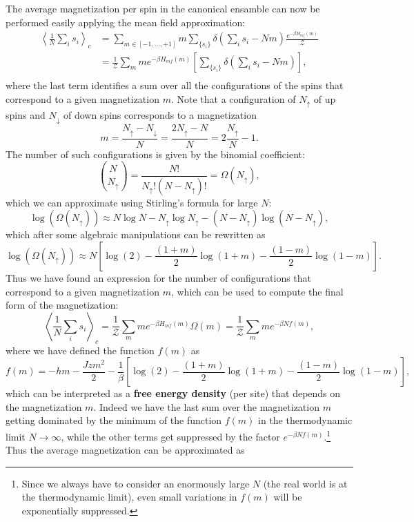 The average magnetization per spin in the canonical ensamble can now be performed easily applying the mean field approximation:
\[
    \begin{aligned}
        \left\langle \frac{1}{N} \sum_{i} s_i \right\rangle_c & = \sum_{m \in [-1, \ldots, +1]} m \sum_{\{s_i\}} \delta\left(\sum_{i} s_i - Nm\right) \frac{e^{-\beta H_{mf}(m)}}{\mathcal{Z}} \\
                                                              & = \frac{1}{\mathcal{Z}} \sum_{m} m e^{-\beta H_{mf}(m)} \left[ \sum_{\{s_i\}} \delta\left(\sum_{i} s_i - Nm\right) \right],    \\
    \end{aligned}
\]
where the last term identifies a sum over all the configurations of the spins that correspond to a given magnetization \(m\). Note that a configuration of \(N_{\uparrow}\) of up spins and \(N_{\downarrow}\) of down spins corresponds to a magnetization
\[
    m = \frac{N_{\uparrow} - N_{\downarrow}}{N} = \frac{2 N_{\uparrow} - N}{N} = 2 \frac{N_{\uparrow}}{N} - 1.
\]
The number of such configurations is given by the binomial coefficient:
\[
    \binom{N}{N_{\uparrow}} = \frac{N!}{N_{\uparrow}! (N - N_{\uparrow})!} = \Omega(N_\uparrow),
\]
which we can approximate using Stirling's formula for large \(N\):
\[
    \log(\Omega(N_\uparrow)) \approx N \log N - N_{\uparrow} \log N_{\uparrow} - (N - N_{\uparrow}) \log (N - N_{\uparrow}),
\]
which after some algebraic manipulations can be rewritten as
\[
    \log(\Omega(N_\uparrow)) \approx N \left[ \log(2) - \frac{(1+m)}{2}\log (1+m) - \frac{(1-m)}{2}\log (1-m) \right].
\]
Thus we have found an expression for the number of configurations that correspond to a given magnetization \(m\), which can be used to compute the final form of the magnetization:
\[
    \left\langle \frac{1}{N} \sum_{i} s_i \right\rangle_c = \frac{1}{\mathcal{Z}} \sum_{m} m e^{-\beta H_{mf}(m)} \Omega(m) = \frac{1}{\mathcal{Z}} \sum_{m} m e^{-\beta N f(m)},
\]
where we have defined the function \(f(m)\) as
\[
    f(m) = - hm - \frac{Jzm^2}{2} - \frac{1}{\beta} \left[ \log(2) - \frac{(1+m)}{2}\log (1+m) - \frac{(1-m)}{2}\log (1-m) \right],
\]
which can be interpreted as a \textbf{free energy density} (per site) that depends on the magnetization \(m\). Indeed we have the last sum over the magnetization \(m\) getting dominated by the minimum of the function \(f(m)\) in the thermodynamic limit \(N \to \infty\), while the other terms get suppressed by the factor \(e^{-\beta N f(m)}\).\footnote{Since we always have to consider an enormously large \(N\) (the real world is at the thermodynamic limit), even small variations in \(f(m)\) will be exponentially suppressed.} Thus the average magnetization can be approximated as
